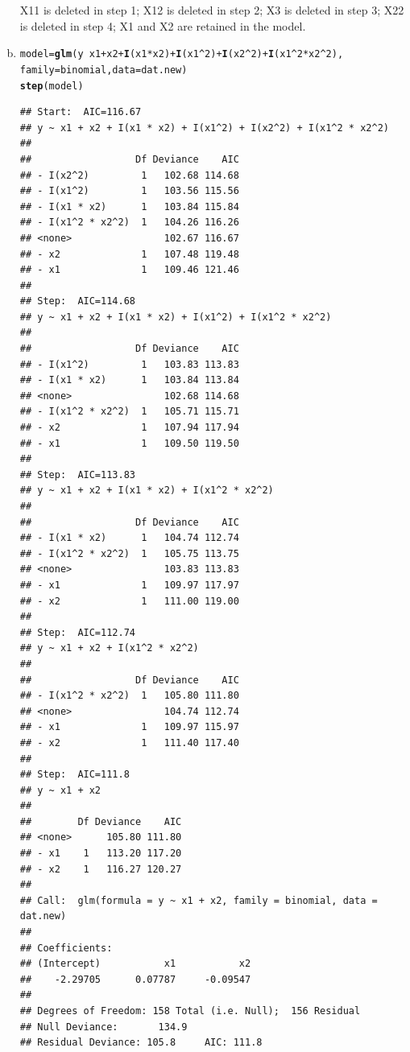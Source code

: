 \documentclass{article}\usepackage[]{graphicx}\usepackage[]{color}
\makeatletter
\newcommand{\hlnum}[1]{\textcolor[rgb]{0.686,0.059,0.569}{#1}}%
\newcommand{\hlopt}[1]{\textcolor[rgb]{0,0,0}{#1}}%
\newcommand{\hlstd}[1]{\textcolor[rgb]{0.345,0.345,0.345}{#1}}%
\newcommand{\hlkwb}[1]{\textcolor[rgb]{0.69,0.353,0.396}{#1}}%
\newcommand{\hlkwc}[1]{\textcolor[rgb]{0.333,0.667,0.333}{#1}}%
\newcommand{\hlkwd}[1]{\textcolor[rgb]{0.737,0.353,0.396}{\textbf{#1}}}%
\newenvironment{kframe}{%
 \def\at@end@of@kframe{}%
 \ifinner\ifhmode%
  \def\at@end@of@kframe{\end{minipage}}%
  \begin{minipage}{\columnwidth}%
 \fi\fi%
 \def\FrameCommand##1{\hskip\@totalleftmargin \hskip-\fboxsep
 \colorbox{shadecolor}{##1}\hskip-\fboxsep
     \hskip-\linewidth \hskip-\@totalleftmargin \hskip\columnwidth}%
 \MakeFramed {\advance\hsize-\width
   \@totalleftmargin\z@ \linewidth\hsize
   \@setminipage}}%
 {\par\unskip\endMakeFramed%
 \at@end@of@kframe}
\newenvironment{knitrout}{}{} %
\makeatother
\begin{document}
\begin{enumerate}[(a)]
\qquad X11 is deleted in step 1; X12 is deleted in step 2; X3 is deleted in step 3; X22 is deleted in step 4; X1 and X2 are retained in the model.

\item

\begin{knitrout}
\color{fgcolor}\begin{kframe}
\begin{alltt}
  \hlstd{model} \hlkwb{=} \hlkwd{glm}\hlstd{(y} \hlopt{~} \hlstd{x1} \hlopt{+} \hlstd{x2} \hlopt{+} \hlkwd{I}\hlstd{(x1}\hlopt{*}\hlstd{x2)} \hlopt{+} \hlkwd{I}\hlstd{(x1}\hlopt{^}\hlnum{2}\hlstd{)} \hlopt{+} \hlkwd{I}\hlstd{(x2}\hlopt{^}\hlnum{2}\hlstd{)} \hlopt{+} \hlkwd{I}\hlstd{(x1}\hlopt{^}\hlnum{2}\hlopt{*}\hlstd{x2}\hlopt{^}\hlnum{2}\hlstd{),}
              \hlkwc{family} \hlstd{= binomial,} \hlkwc{data} \hlstd{= dat.new)}
  \hlkwd{step}\hlstd{(model)}
\end{alltt}
\begin{verbatim}
## Start:  AIC=116.67
## y ~ x1 + x2 + I(x1 * x2) + I(x1^2) + I(x2^2) + I(x1^2 * x2^2)
## 
##                  Df Deviance    AIC
## - I(x2^2)         1   102.68 114.68
## - I(x1^2)         1   103.56 115.56
## - I(x1 * x2)      1   103.84 115.84
## - I(x1^2 * x2^2)  1   104.26 116.26
## <none>                102.67 116.67
## - x2              1   107.48 119.48
## - x1              1   109.46 121.46
## 
## Step:  AIC=114.68
## y ~ x1 + x2 + I(x1 * x2) + I(x1^2) + I(x1^2 * x2^2)
## 
##                  Df Deviance    AIC
## - I(x1^2)         1   103.83 113.83
## - I(x1 * x2)      1   103.84 113.84
## <none>                102.68 114.68
## - I(x1^2 * x2^2)  1   105.71 115.71
## - x2              1   107.94 117.94
## - x1              1   109.50 119.50
## 
## Step:  AIC=113.83
## y ~ x1 + x2 + I(x1 * x2) + I(x1^2 * x2^2)
## 
##                  Df Deviance    AIC
## - I(x1 * x2)      1   104.74 112.74
## - I(x1^2 * x2^2)  1   105.75 113.75
## <none>                103.83 113.83
## - x1              1   109.97 117.97
## - x2              1   111.00 119.00
## 
## Step:  AIC=112.74
## y ~ x1 + x2 + I(x1^2 * x2^2)
## 
##                  Df Deviance    AIC
## - I(x1^2 * x2^2)  1   105.80 111.80
## <none>                104.74 112.74
## - x1              1   109.97 115.97
## - x2              1   111.40 117.40
## 
## Step:  AIC=111.8
## y ~ x1 + x2
## 
##        Df Deviance    AIC
## <none>      105.80 111.80
## - x1    1   113.20 117.20
## - x2    1   116.27 120.27
## 
## Call:  glm(formula = y ~ x1 + x2, family = binomial, data = dat.new)
## 
## Coefficients:
## (Intercept)           x1           x2  
##    -2.29705      0.07787     -0.09547  
## 
## Degrees of Freedom: 158 Total (i.e. Null);  156 Residual
## Null Deviance:	    134.9 
## Residual Deviance: 105.8 	AIC: 111.8
\end{verbatim}
\end{kframe}
\end{knitrout}


\end{enumerate}
\end{document}
